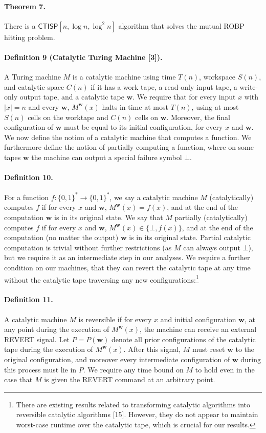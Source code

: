 \documentclass[10pt,a4paper]{article}
\begin{document}
\paragraph{Theorem 7.} There is a $\mathsf{CTISP}[n,\log n,\log^2 n]$ algorithm that solves the mutual ROBP hitting problem.
\paragraph{Definition 9 (Catalytic Turing Machine [3]).} A Turing machine $M$ is a catalytic machine using time $T(n)$, workspace $S(n)$, and catalytic space $C(n)$ if it has a work tape, a read-only input tape, a write-only output tape, and a catalytic tape $\mathbf{w}$. We require that for every input $x$ with $|x|=n$ and every $\mathbf{w}$, $M^{\mathbf{w}}(x)$ halts in time at most $T(n)$, using at most $S(n)$ cells on the worktape and $C(n)$ cells on $\mathbf{w}$. Moreover, the final configuration of $\mathbf{w}$ must be equal to its initial configuration, for every $x$ and $\mathbf{w}$.
We now define the notion of a catalytic machine that computes a function. We furthermore define the notion of partially computing a function, where on some tapes $\mathbf{w}$ the machine can output a special failure symbol $\bot$.
\paragraph{Definition 10.} For a function $f:\{0,1\}^*\to\{0,1\}^*$, we say a catalytic machine $M$ (catalytically) computes $f$ if for every $x$ and $\mathbf{w}$, $M^{\mathbf{w}}(x)=f(x)$, and at the end of the computation $\mathbf{w}$ is in its original state. We say that $M$ partially (catalytically) computes $f$ if for every $x$ and $\mathbf{w}$, $M^{\mathbf{w}}(x)\in\{\bot,f(x)\}$, and at the end of the computation (no matter the output) $\mathbf{w}$ is in its original state.
Partial catalytic computation is trivial without further restrictions (as $M$ can always output $\bot$), but we require it as an intermediate step in our analyses. We require a further condition on our machines, that they can revert the catalytic tape at any time without the catalytic tape traversing any new configurations:\footnote{There are existing results related to transforming catalytic algorithms into reversible catalytic algorithms [15]. However, they do not appear to maintain worst-case runtime over the catalytic tape, which is crucial for our results.}
\paragraph{Definition 11.} A catalytic machine $M$ is reversible if for every $x$ and initial configuration $\mathbf{w}$, at any point during the execution of $M^{\mathbf{w}}(x)$, the machine can receive an external REVERT signal. Let $P=P(\mathbf{w})$ denote all prior configurations of the catalytic tape during the execution of $M^{\mathbf{w}}(x)$. After this signal, $M$ must reset $\mathbf{w}$ to the original configuration, and moreover every intermediate configuration of $\mathbf{w}$ during this process must lie in $P$. We require any time bound on $M$ to hold even in the case that $M$ is given the REVERT command at an arbitrary point.
\end{document}
